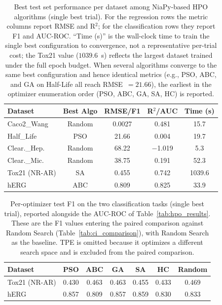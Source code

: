 \documentclass[journal]{IEEEtran}
\begin{document}
\begin{table}[!t]
\centering
\caption{Best test set performance per dataset among NiaPy-based HPO algorithms (single best trial). For the regression rows the metric columns report RMSE and R$^2$; for the classification rows they report F1 and AUC-ROC. ``Time (s)'' is the wall-clock time to train the single best configuration to convergence, not a representative per-trial cost; the Tox21 value ($1039.6$~s) reflects the largest dataset trained under the full epoch budget. When several algorithms converge to the same best configuration and hence identical metrics (e.g., PSO, ABC, and GA on Half-Life all reach RMSE~$=21.66$), the earliest in the optimizer enumeration order (PSO, ABC, GA, SA, HC) is reported.}
\label{tab:best_results}
\small
\setlength{\tabcolsep}{4pt}
\begin{tabular}{lcccc}
\toprule
\textbf{Dataset} & \textbf{Best Algo} & \textbf{RMSE/F1} & \textbf{R$^2$/AUC} & \textbf{Time (s)} \\
\midrule
Caco2\_Wang & Random & 0.0027 & 0.481 & 15.7 \\
Half\_Life & PSO & 21.66 & 0.004 & 19.7 \\
Clear.\_Hep. & Random & 68.22 & $-$1.019 & 5.3 \\
Clear.\_Mic. & Random & 38.75 & 0.191 & 52.3 \\
Tox21 (NR-AR) & SA & 0.455 & 0.742 & 1039.6 \\
hERG & ABC & 0.809 & 0.825 & 33.9 \\
\bottomrule
\end{tabular}
\end{table}

\begin{table}[!t]
\centering
\caption{Per-optimizer test F1 on the two classification tasks (single best trial), reported alongside the AUC-ROC of Table~\ref{tab:hpo_results}. These are the F1 values entering the paired comparison against Random Search (Table~\ref{tab:ci_comparison}), with Random Search as the baseline. TPE is omitted because it optimizes a different search space and is excluded from the paired comparison.}
\label{tab:hpo_f1}
\small
\setlength{\tabcolsep}{4pt}
\begin{tabular}{lcccccc}
\toprule
\textbf{Dataset} & \textbf{PSO} & \textbf{ABC} & \textbf{GA} & \textbf{SA} & \textbf{HC} & \textbf{Random} \\
\midrule
Tox21 (NR-AR) & 0.430 & 0.463 & 0.463 & 0.455 & 0.433 & 0.469 \\
hERG & 0.857 & 0.809 & 0.857 & 0.859 & 0.830 & 0.833 \\
\bottomrule
\end{tabular}
\end{table}
\end{document}
